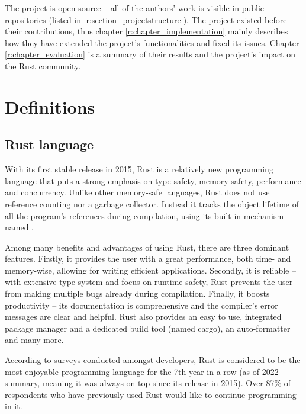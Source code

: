 \documentclass[licencjacka,en]{pracamgr}
\begin{document}
The project is open-source -- all of the authors' work is visible in public repositories (listed in
\ref{r:section_projectstructure}). The project existed before their contributions, thus chapter
\ref{r:chapter_implementation} mainly describes how they have extended the project's
functionalities and fixed its issues. Chapter \ref{r:chapter_evaluation} is a summary of their
results and the project's impact on the Rust community.


\chapter{Definitions}\label{r:chapter_definitions}

\section{Rust language}

With its first stable release in 2015, Rust is a relatively new programming language that
puts a strong emphasis on type-safety, memory-safety, performance and concurrency. Unlike
other memory-safe languages, Rust does not use reference counting nor a garbage collector.
Instead it tracks the object lifetime of all the program's references during compilation,
using its built-in mechanism named .

Among many benefits and advantages of using Rust, there are three dominant features. Firstly,
it provides the user with a great performance, both time- and memory-wise, allowing for
writing efficient applications. Secondly, it is reliable -- with extensive type system and
focus on runtime safety, Rust prevents the user from making multiple bugs
already during compilation. Finally, it boosts productivity -- its documentation is
comprehensive and the compiler's error messages are clear and helpful. Rust also provides
an easy to use, integrated package manager and a dedicated build tool (named cargo),
an auto-formatter and many more.

According to surveys \cite{survey} conducted amongst developers, Rust is considered to be the most
enjoyable programming language for the 7th year in a row (as of 2022 summary, meaning it was always
on top since its release in 2015). Over 87\% of respondents who have previously used Rust would
like to continue programming in it.
\end{document}
